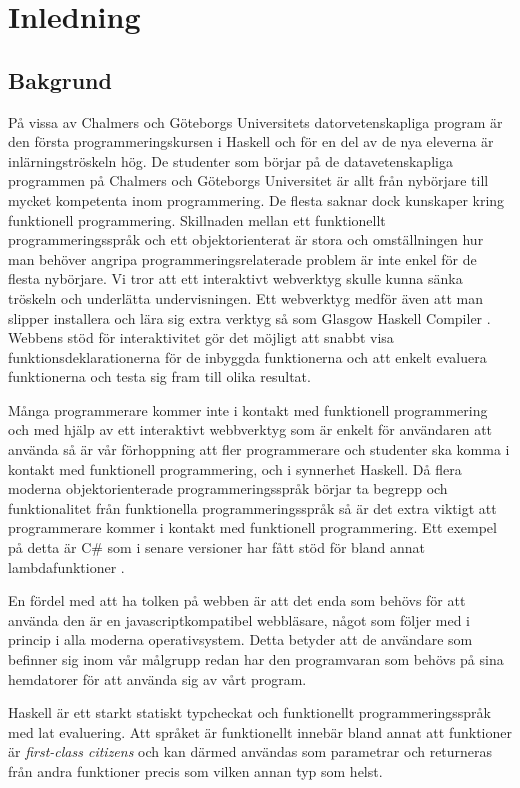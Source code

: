 ﻿\section{Inledning}

\subsection{Bakgrund}
På vissa av Chalmers och Göteborgs Universitets datorvetenskapliga program är den första programmeringskursen i Haskell \citep{haskell98} och för en del av de nya eleverna är inlärningströskeln hög. De studenter som börjar på de datavetenskapliga programmen på Chalmers och Göteborgs Universitet är allt från nybörjare till mycket kompetenta inom programmering. De flesta saknar dock kunskaper kring funktionell programmering. Skillnaden mellan ett funktionellt programmeringsspråk och ett objektorienterat är stora och omställningen hur man behöver angripa programmeringsrelaterade problem är inte enkel för de flesta nybörjare. Vi tror att ett interaktivt webverktyg skulle kunna sänka tröskeln och underlätta undervisningen. Ett webverktyg medför även att man slipper installera och lära sig extra verktyg så som Glasgow Haskell Compiler \citep{ghc}. Webbens stöd för interaktivitet gör det möjligt att snabbt visa funktionsdeklarationerna för de inbyggda funktionerna och att enkelt evaluera funktionerna och testa sig fram till olika resultat.

Många programmerare kommer inte i kontakt med funktionell programmering  och med hjälp av ett interaktivt webbverktyg som är enkelt för användaren att använda så är vår förhoppning att fler programmerare och studenter ska komma i kontakt med funktionell programmering, och i synnerhet Haskell. Då flera moderna objektorienterade programmeringsspråk börjar ta begrepp och funktionalitet från funktionella programmeringsspråk så är det extra viktigt att programmerare kommer i kontakt med funktionell programmering. Ett exempel på detta är C\# som i senare versioner har fått stöd för bland annat lambdafunktioner \citep{csharp}. 

En fördel med att ha tolken på webben är att det enda som behövs för att använda den är en javascriptkompatibel webbläsare, något som följer med i princip i alla moderna operativsystem. Detta betyder att de användare som befinner sig inom vår målgrupp redan har den programvaran som behövs på sina hemdatorer för att använda sig av vårt program.

Haskell är ett starkt statiskt typcheckat och funktionellt programmeringsspråk med lat evaluering. %
Att språket är funktionellt innebär bland annat att funktioner är \emph{first-class citizens} och kan därmed användas som parametrar och returneras från andra funktioner precis som vilken annan typ som helst.

